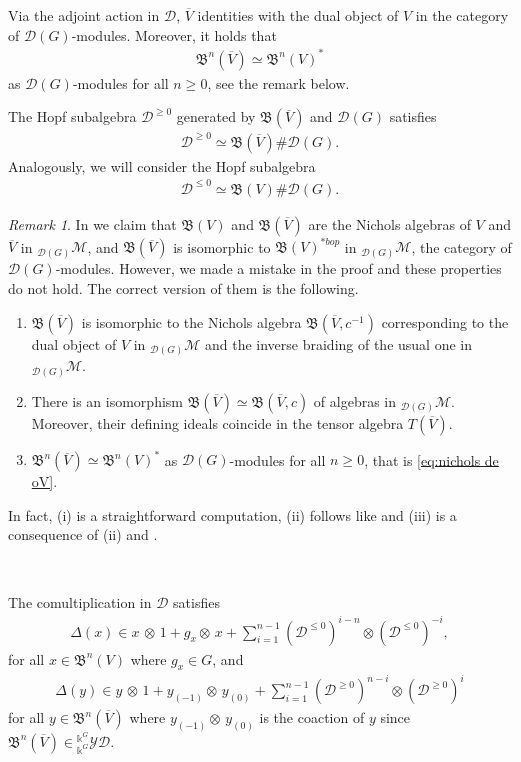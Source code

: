 \documentclass[reqno]{amsart}
\newcommand{\cM}{\mathcal{M}}
\newcommand{\oV}{\overline{V}}
\renewcommand{\_}[1]{_{\left( #1 \right)}}
\renewcommand{\^}[1]{^{\left( #1 \right)}}
\newcommand{\ot}{{\otimes}}
\newcommand{\ku}{\Bbbk}
\newcommand{\D}{\mathcal{D}}
\newcommand{\BV}{{\mathfrak B}}
\newcommand{\ydgdual}{{}^{\ku^G}_{\ku^G}\mathcal{YD}}
\theoremstyle{plain}
\theoremstyle{definition}
\theoremstyle{remark}
\newtheorem{obs}[lema]{Remark}
\begin{document}
Via the adjoint action in $\D$, $\oV$ identities with the dual object of $V$  in the category of $\D(G)$-modules. Moreover, it holds that
\begin{align}\label{eq:nichols de oV}
\BV^n(\oV)\simeq\BV^n(V)^*
\end{align}
as $\D(G)$-modules for all $n\geq0$, see the remark below.

The Hopf subalgebra $\D^{\geq0}$ generated by $\BV(\oV)$ and $\D(G)$ satisfies
\begin{align*}
\D^{\geq0}\simeq\BV(\oV)\#\D(G). 
\end{align*}
Analogously, we will consider the Hopf subalgebra
\begin{align*}
\D^{\leq0}\simeq\BV(V)\#\D(G). 
\end{align*}

\begin{obs}
In \cite[Lemma 11 (iii) and (iv)]{PV2} we claim that $\BV(V)$ and $\BV(\oV)$ are the Nichols algebras of $V$ and $\oV$ in ${}_{\D(G)}\cM$, and $\BV(\oV)$ is isomorphic to $\BV(V)^{*bop}$ in ${}_{\D(G)}\cM$, the category of $\D(G)$-modules. However, we made a mistake in the proof and these properties do not hold. The correct version of them is the following.
\begin{enumerate}\renewcommand{\theenumi}{\roman{enumi}}\renewcommand{\labelenumi}{
(\theenumi)}
\item $\BV(\oV)$ is isomorphic to the Nichols algebra $\BV(\oV,c^{-1})$ corresponding to the dual object of $V$ in ${}_{\D(G)}\cM$ and the inverse braiding of the usual one in ${}_{\D(G)}\cM$.
\item There is an isomorphism $\BV(\oV)\simeq\BV(\oV,c)$ of algebras in ${}_{\D(G)}\cM$. Moreover, their defining ideals coincide in the tensor algebra $T(\oV)$.
\smallskip
\item $\BV^n(\oV)\simeq\BV^n(V)^*$ as $\D(G)$-modules for all $n\geq0$, that is \eqref{eq:nichols de oV}.
\end{enumerate} 

In fact, (i) is a straightforward computation, (ii) follows like \cite[Lemma 1.11]{MR2766176} and (iii) is a consequence of (ii) and \cite[Proposition 3.2.30]{MR1714540}.
\end{obs}


\

The comultiplication in $\D$ satisfies
\begin{align}\label{eq:comult in Dleq0}
\Delta(x)\in x\,\ot\,1+g_{x}\ot\,x+\sum_{i=1}^{n-1}(\D^{\leq0})^{i-n}\ot(\D^{\leq0})^{-i}, 
\end{align}
for all $x\in\BV^n(V)$ where $g_x\in G$, and
\begin{align}\label{eq:comult in Dgeq0}
\Delta(y)\in y\,\ot\,1+y\_{-1}\ot\,y\_{0}+\sum_{i=1}^{n-1}(\D^{\geq0})^{n-i}\ot(\D^{\geq0})^{i} 
\end{align}
for all $y\in\BV^n(\oV)$ where $y\_{-1}\ot\,y\_{0}$ is the coaction of $y$ since $\BV^n(\oV)\in\ydgdual$.
\end{document}
